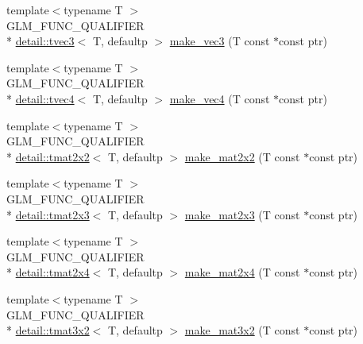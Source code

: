 \begin{DoxyCompactItemize}
\item 
{\footnotesize template$<$typename T $>$ }\\G\-L\-M\-\_\-\-F\-U\-N\-C\-\_\-\-Q\-U\-A\-L\-I\-F\-I\-E\-R \\*
\hyperlink{structglm_1_1detail_1_1tvec3}{detail\-::tvec3}$<$ T, defaultp $>$ \hyperlink{group__gtc__type__ptr_gad91a6a0fe324630b151208703a1591ed}{make\-\_\-vec3} (T const $\ast$const ptr)
\item 
{\footnotesize template$<$typename T $>$ }\\G\-L\-M\-\_\-\-F\-U\-N\-C\-\_\-\-Q\-U\-A\-L\-I\-F\-I\-E\-R \\*
\hyperlink{structglm_1_1detail_1_1tvec4}{detail\-::tvec4}$<$ T, defaultp $>$ \hyperlink{group__gtc__type__ptr_ga1b9e0d9ca48d79ba87edc121c1872c44}{make\-\_\-vec4} (T const $\ast$const ptr)
\item 
{\footnotesize template$<$typename T $>$ }\\G\-L\-M\-\_\-\-F\-U\-N\-C\-\_\-\-Q\-U\-A\-L\-I\-F\-I\-E\-R \\*
\hyperlink{structglm_1_1detail_1_1tmat2x2}{detail\-::tmat2x2}$<$ T, defaultp $>$ \hyperlink{group__gtc__type__ptr_ga860d529f631ea6f9a0e510491d29a8ac}{make\-\_\-mat2x2} (T const $\ast$const ptr)
\item 
{\footnotesize template$<$typename T $>$ }\\G\-L\-M\-\_\-\-F\-U\-N\-C\-\_\-\-Q\-U\-A\-L\-I\-F\-I\-E\-R \\*
\hyperlink{structglm_1_1detail_1_1tmat2x3}{detail\-::tmat2x3}$<$ T, defaultp $>$ \hyperlink{group__gtc__type__ptr_gadef48cd950566f23a4b1e47127ee478c}{make\-\_\-mat2x3} (T const $\ast$const ptr)
\item 
{\footnotesize template$<$typename T $>$ }\\G\-L\-M\-\_\-\-F\-U\-N\-C\-\_\-\-Q\-U\-A\-L\-I\-F\-I\-E\-R \\*
\hyperlink{structglm_1_1detail_1_1tmat2x4}{detail\-::tmat2x4}$<$ T, defaultp $>$ \hyperlink{group__gtc__type__ptr_ga174a43e8913682834de9cd918e36df25}{make\-\_\-mat2x4} (T const $\ast$const ptr)
\item 
{\footnotesize template$<$typename T $>$ }\\G\-L\-M\-\_\-\-F\-U\-N\-C\-\_\-\-Q\-U\-A\-L\-I\-F\-I\-E\-R \\*
\hyperlink{structglm_1_1detail_1_1tmat3x2}{detail\-::tmat3x2}$<$ T, defaultp $>$ \hyperlink{group__gtc__type__ptr_gaa40868af4de8c5ed5470fdcc9985dbfc}{make\-\_\-mat3x2} (T const $\ast$const ptr)
\item 

\end{DoxyCompactItemize}
